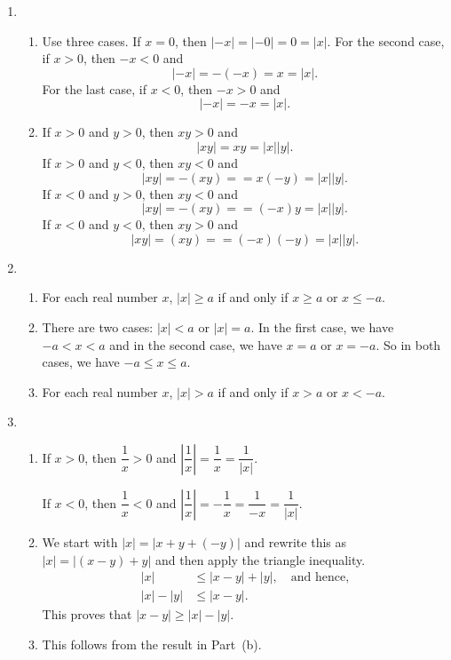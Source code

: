 \begin{enumerate}
\item \begin{enumerate}
\item Use three cases.  If $x = 0$, then $|-x| = |-0| = 0 = |x|$.  For the second case, if 
$x > 0$, then $-x < 0$ and
\[
|-x| = - (-x) = x = |x|.
\]
For the last case, if $x < 0$, then $-x > 0$ and
\[
|-x| = -x = |x|.
\]

\item If $x > 0$ and $y > 0$, then $xy > 0$ and
\[
|xy| = xy = |x||y|.
\]
If $x > 0$ and $y < 0$, then $xy < 0$ and
\[
|xy| = -(xy) = = x (-y) = |x||y|.
\]
If $x < 0$ and $y > 0$, then $xy < 0$ and
\[
|xy| = -(xy) = = (-x)y = |x||y|.
\]
If $x < 0$ and $y < 0$, then $xy > 0$ and
\[
|xy| = (xy) = = (-x) (-y) = |x||y|.
\]
\end{enumerate}


\item \begin{enumerate}
\item For each real number $x$, $\left| x \right| \geq a$ if and only if $x \geq a$ or 
$x \leq -a$.

\item There are two cases:  $|x| < a$ or $|x| = a$.  In the first case, we have $-a < x < a$ and in the second case, we have $x = a$ or $x = -a$.  So in both cases, we have $-a \leq x \leq a$.

\item For each real number $x$, $\left| x \right| > a$ if and only if $x > a$ or 
$x < -a$.
\end{enumerate}


\item \begin{enumerate}
\item If $x > 0$, then $\dfrac{1}{x} > 0$ and $\left| \dfrac{1}{x} \right| = \dfrac{1}{x} = \dfrac{1}{|x|}$.

If $x < 0$, then $\dfrac{1}{x} < 0$ and $\left| \dfrac{1}{x} \right| = - \dfrac{1}{x} = 
\dfrac{1}{-x} = \dfrac{1}{|x|}$.

\item We start with $|x| = |x + y + (-y)|$ and rewrite this as $|x| = |(x -y) + y|$ and then apply the triangle inequality.
\begin{align*}
      |x| &\leq |x - y| + |y|, \quad \text{and hence,} \\
|x| - |y| &\leq |x - y|.
\end{align*}
This proves that $|x - y| \geq |x| - |y|$.

\item This follows from the result in Part~(b).
\end{enumerate}
\end{enumerate}




